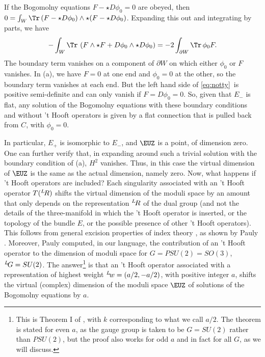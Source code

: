 If the Bogomolny equations $F-\star D\phi_0=0$ are obeyed, then
$0=\int_W\Tr\,(F-\star D\phi_0)\wedge \star (F-\star D\phi_0)$.
Expanding this out and integrating by parts, we have
\setcounter{equation}{1}
\begin{equation}\label{eq:notty}
-\int_W\Tr\,\left(F\wedge\star F+D\phi_0 \wedge \star
D\phi_0\right)=-2\int_{\partial W}\Tr\,\phi_0 F.
\end{equation}
 The boundary
term vanishes on a component of $\partial W$ on which either
$\phi_0$ or $F$ vanishes.  In \utampo(a), we have $F=0$ at one end
and $\phi_0=0$ at the other, so the boundary term vanishes at each
end. But the left hand side of \eqref{eq:notty}\ is positive semi-definite
and can only vanish if $F=D\phi_0=0$.  So, given that $E_-$ is
flat, any solution of the Bogomolny equations with these boundary
conditions and without 't Hooft operators is given by a flat
connection that is pulled back from $C$, with $\phi_0=0$.

In particular, $E_+$ is isomorphic to $E_-$, and ${\EUZ}$ is a
point, of dimension zero.   One can further verify that, in
expanding around such a trivial solution with the boundary
condition of \utampo(a), $H^2$ vanishes. Thus, in this case the
virtual dimension of ${\EUZ}$ is the same as the actual dimension,
namely zero.  Now, what happens if 't Hooft operators are
included? Each singularity associated with an 't Hooft operator
$T(^L\negthinspace R)$ shifts the virtual dimension of the moduli
space by an amount that only depends on the representation
$^L\negthinspace R$ of the dual group (and not the details of the
three-manifold in which the 't Hooft operator is inserted, or the
topology of the bundle $E$, or the possible presence of other 't
Hooft operators). This follows from general excision properties of
index theory \cite{ref123}, as shown by Pauly \cite{ref124}. Moreover, Pauly computed, in our
language, the contribution of an 't Hooft operator to the
dimension of moduli space
 for $G=PSU(2)=SO(3)$, $^L\negthinspace G=SU(2)$. The
answer\footnote{This is Theorem I of \cite{ref124}, with $k$ corresponding to
what we call $a/2$.  The theorem is stated for even $a$, as the
gauge group is taken to be $G=SU(2)$ rather than $PSU(2)$, but the
proof also works for odd $a$ and in fact for all $G$, as we will
discuss.} is that an 't Hooft operator associated with a
representation of highest weight $^L\negthinspace w=(a/2,-a/2)$,
with  positive integer $a$, shifts the virtual (complex) dimension
of the moduli space ${\EUZ}$ of solutions of the Bogomolny
equations by  $a$.

